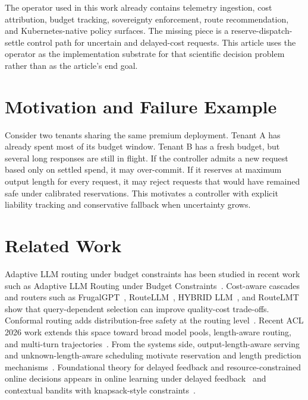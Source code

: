 \documentclass[10pt,journal,compsoc]{IEEEtran}
\begin{document}
The operator used in this work already contains telemetry ingestion, cost
attribution, budget tracking, sovereignty enforcement, route recommendation,
and Kubernetes-native policy surfaces. The missing piece is a reserve-dispatch-
settle control path for uncertain and delayed-cost requests. This article uses
the operator as the implementation substrate for that scientific decision
problem rather than as the article's end goal.

\section{Motivation and Failure Example}
Consider two tenants sharing the same premium deployment. Tenant A has already
spent most of its budget window. Tenant B has a fresh budget, but several long
responses are still in flight. If the controller admits a new request based
only on settled spend, it may over-commit. If it reserves at maximum output
length for every request, it may reject requests that would have remained safe
under calibrated reservations. This motivates a controller with explicit
liability tracking and conservative fallback when uncertainty grows.

\section{Related Work}
Adaptive LLM routing under budget constraints has been studied in recent work
such as Adaptive LLM Routing under Budget Constraints~\cite{panda2025adaptive}.
Cost-aware cascades and routers such as FrugalGPT~\cite{chen2023frugalgpt},
RouteLLM~\cite{ong2024routellm}, HYBRID LLM~\cite{ding2024hybrid}, and
RouteLMT~\cite{luo2026routelmt} show that query-dependent selection can improve
quality-cost trade-offs. Conformal routing adds distribution-free safety at the
routing level~\cite{uddin2026conformal}. Recent ACL 2026 work extends this
space toward broad model pools, length-aware routing, and multi-turn
trajectories~\cite{shi2026inferencedynamics,fu2026flare,zhang2026mtrouter}.
From the systems side, output-length-aware serving and unknown-length-aware
scheduling motivate reservation and length prediction
mechanisms~\cite{qiu2024ssjf,xie2026forelen,ruan2026libra}. Foundational theory
for delayed feedback and resource-constrained online decisions appears in
online learning under delayed feedback~\cite{joulani2013delayed} and contextual
bandits with knapsack-style constraints~\cite{badanidiyuru2014resourceful,han2023cbwk}.
\end{document}
